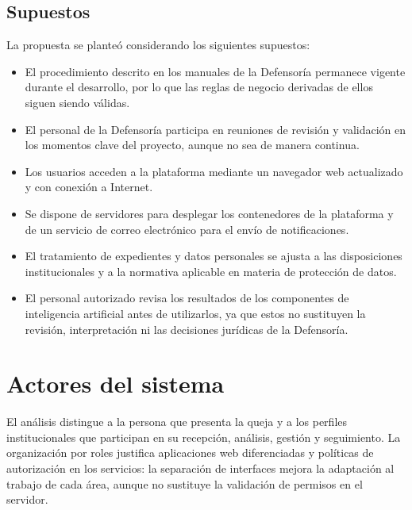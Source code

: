 \subsection{Supuestos}
La propuesta se planteó considerando los siguientes supuestos:

\begin{itemize}
    \item El procedimiento descrito en los manuales de la Defensoría permanece vigente durante el desarrollo, por lo que las reglas de negocio derivadas de ellos siguen siendo válidas.
    \item El personal de la Defensoría participa en reuniones de revisión y validación en los momentos clave del proyecto, aunque no sea de manera continua.
    \item Los usuarios acceden a la plataforma mediante un navegador web actualizado y con conexión a Internet.
    \item Se dispone de servidores para desplegar los contenedores de la plataforma y de un servicio de correo electrónico para el envío de notificaciones.
    \item El tratamiento de expedientes y datos personales se ajusta a las disposiciones institucionales y a la normativa aplicable en materia de protección de datos.
    \item El personal autorizado revisa los resultados de los componentes de inteligencia artificial antes de utilizarlos, ya que estos no sustituyen la revisión, interpretación ni las decisiones jurídicas de la Defensoría.
\end{itemize}


	\section{Actores del sistema}
	\label{sec:actores}
	El análisis distingue a la persona que presenta la queja y a los perfiles institucionales
	que participan en su recepción, análisis, gestión y seguimiento. La organización por roles
	justifica aplicaciones web diferenciadas y políticas de autorización en los servicios: la
	separación de interfaces mejora la adaptación al trabajo de cada área, aunque no sustituye
	la validación de permisos en el servidor.
	

